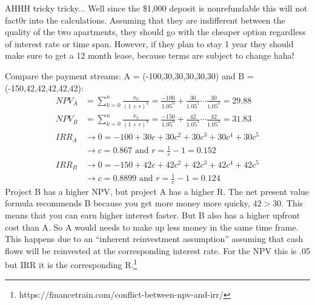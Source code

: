 \documentclass[12pt]{article}
\newenvironment{problem}[2][Problem]{\begin{trivlist}
\item[\hskip \labelsep {\bfseries #1}\hskip \labelsep {\bfseries #2.}]}{\end{trivlist}}
\begin{document}
\begin{problem}{2.8} AHHH tricky tricky... Well since the \$1,000 deposit is nonrefundable this will not fact0r into the calculations. Assuming that they are indifferent between the quality of the two apartments, they should go with the cheaper option regardless of interest rate or time span. However, if they plan to stay 1 year they should make sure to get a 12 month lease, because terms are subject to change haha! 
\end{problem} 

\begin{problem}{2.13} Compare the payment streams: A = (-100,30,30,30,30,30) and B = (-150,42,42,42,42,42): 
\begin{align*}
NPV_{A} &= \sum^n_{k=0} \frac{x_k}{(1+r)^k} = \frac{-100}{1.05^0} +\frac{30}{1.05^1} \cdots \frac{30}{1.05^4} =29.88  \\
NPV_{B} &= \sum^n_{k=0} \frac{x_k}{(1+r)^k} = \frac{-150}{1.05^0} +\frac{42}{1.05^1} \cdots \frac{42}{1.05^4} = 31.83 \\
IRR_A &\rightarrow 0 =-100 +30c +30c^2 +30c^3 +30c^4 +30c^5 \\
&\rightarrow c = 0.867 \text{ and } r=\frac{1}{c}-1=0.152 \\
IRR_B &\rightarrow 0 =-150 +42c +42c^2 +42c^3 +42c^4 +42c^5 \\
&\rightarrow c = 0.8899 \text{ and }  r=\frac{1}{c}-1=0.124 
\end{align*}
Project B has a higher NPV, but project A has a higher R. The net present value formula recommends B because you get more money more quicky, $42 > 30$. This means that you can earn higher interest faster. But B also has a higher upfront cost than A. So A would needs to make up less money in the same time frame. This happens due to an ``inherent reinvestment assumption'' assuming that cash flows will be reinvested at the corresponding interest rate. For the NPV this is .05 but IRR it is the corresponding R.\footnote{https://financetrain.com/conflict-between-npv-and-irr/} 
\end{problem}

\newpage
\end{document}
